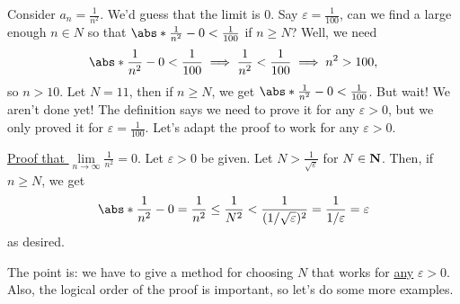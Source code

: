 \begin{Example}{}{}
    Consider $ a_n=\frac{1}{n^2} $. We'd guess that the limit is $ 0 $. Say $ \varepsilon=\frac{1}{100} $, can we find a large enough $ n\in N $
    so that $ \abs*{\frac{1}{n^2}-0}<\frac{1}{100}  $ if $ n\ge N $? Well, we need
    \[ \abs*{\frac{1}{n^2}-0}<\frac{1}{100}\implies \frac{1}{n^2}<\frac{1}{100}\implies n^2>100, \]
    so $ n>10 $. Let $ N=11 $, then if $ n\ge N $, we get
    $ \abs*{\frac{1}{n^2}-0}<\frac{1}{100} $. But wait! We aren't done yet! The definition says we need to prove it for any $ \varepsilon>0 $,
    but we only proved it for $ \varepsilon=\frac{1}{100} $. Let's adapt the proof to work for any $ \varepsilon>0 $.
\end{Example}
\underline{Proof that $ \lim\limits_{{n} \to {\infty}}\frac{1}{n^2}=0 $}.
Let $ \varepsilon>0 $ be given. Let $ N>\frac{1}{\sqrt{\varepsilon}} $ for $ N\in \mathbf{N} $. Then, if $ n\ge N $,
we get
\[ \abs*{\frac{1}{n^2}-0}=\frac{1}{n^2}\le \frac{1}{N^2}<\frac{1}{(1/\sqrt{\varepsilon})^2}=\frac{1}{1/\varepsilon}=\varepsilon \]
as desired.

The point is: we have to give a method for choosing $ N $ that works for \underline{any} $ \varepsilon>0 $. Also, the logical order of the
proof is important, so let's do some more examples.


